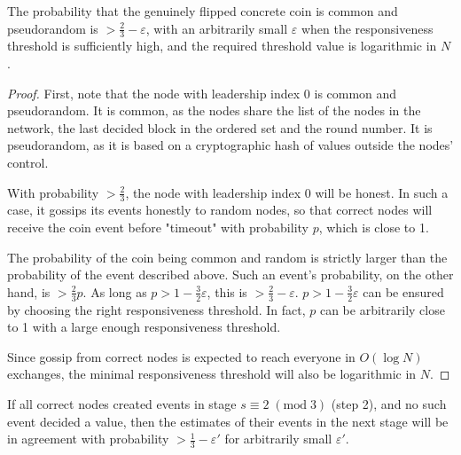 \documentclass[a4paper,fleqn]{article}
\begin{document}
\begin{lem}\label{common}
	The probability that the genuinely flipped concrete coin is common and pseudorandom is
	$> \frac{2}{3} - \varepsilon$, with an arbitrarily small $\varepsilon$ when the responsiveness
	threshold is sufficiently high, and the required threshold value is logarithmic in $N$.
\end{lem}

\begin{proof}
	First, note that the node with leadership index 0 is common and pseudorandom. It is common, 
	as the nodes share the list of the nodes in the network, the last decided block in the ordered
	set and the round number. It is pseudorandom, as it is based on a cryptographic hash of values
	outside the nodes' control.

	With probability $> \frac{2}{3}$, the node with leadership index 0 will be honest. In such a
	case, it gossips its events honestly to random nodes, so that correct nodes will receive the
	coin event before "timeout" with probability $p$, which is close to 1.

	The probability of the coin being common and random is strictly larger than the probability of 
	the event described above. Such an event's probability, on the other hand, is $> \frac{2}{3}p$.
	As long as $p > 1 - \frac{3}{2}\varepsilon$, this is $> \frac{2}{3} - \varepsilon$. $p > 
	1 - \frac{3}{2}\varepsilon$ can be ensured by choosing the right responsiveness threshold. In
	fact, $p$ can be arbitrarily close to 1 with a large enough responsiveness threshold.

	Since gossip from correct nodes is expected to reach everyone in $O(\log{N})$ exchanges, the
	minimal responsiveness threshold will also be logarithmic in $N$.
\end{proof}

\begin{lem}\label{claima}
	If all correct nodes created events in stage $s \equiv 2\;(\textrm{mod}\;3)$ (step 2), and no
	such event decided a value, then the estimates of their events in the next stage will be in
	agreement with probability $> \frac{1}{3} - \varepsilon'$ for arbitrarily small
	$\varepsilon'$.
\end{lem}
\end{document}
